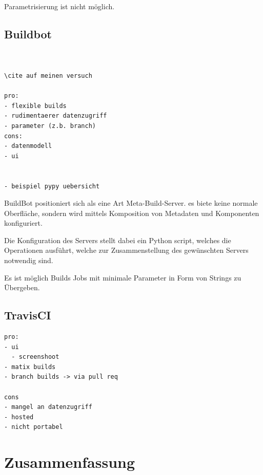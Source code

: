 Parametrisierung ist nicht möglich.

\subsection{Buildbot}


\begin{verbatim}


\cite auf meinen versuch

pro:
- flexible builds
- rudimentaerer datenzugriff
- parameter (z.b. branch)
cons:
- datenmodell
- ui


- beispiel pypy uebersicht

\end{verbatim}


BuildBot positioniert sich als eine Art Meta-Build-Server.
es biete keine normale Oberfläche, sondern wird mittels
Komposition von Metadaten und Komponenten konfiguriert.

Die Konfiguration des Servers stellt dabei ein Python script,
welches die Operationen ausführt, welche zur Zusammenstellung des gewünschten Servers notwendig sind.

Es ist möglich Builds Jobs mit minimale Parameter in Form von Strings zu Übergeben.

\subsection{TravisCI}

\begin{verbatim}
pro:
- ui
  - screenshoot
- matix builds
- branch builds -> via pull req

cons
- mangel an datenzugriff
- hosted
- nicht portabel
\end{verbatim}



\section{Zusammenfassung}



